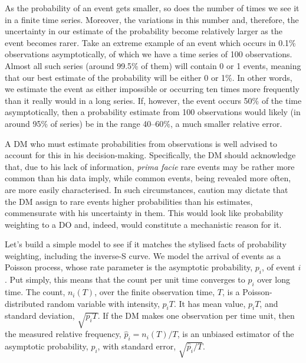 \documentclass[a4paper, 12pt]{article}
\begin{document}
As the probability of an event gets smaller, so does the number of times we see it in a finite time series. Moreover, the variations in this number and, therefore, the uncertainty in our estimate of the probability become relatively larger as the event becomes rarer. Take an extreme example of an event which occurs in 0.1\% observations asymptotically, of which we have a time series of 100 observations. Almost all such series (around 99.5\% of them) will contain 0 or 1 events, meaning that our best estimate of the probability will be either 0 or 1\%. In other words, we estimate the event as either impossible or occurring ten times more frequently than it really would in a long series. If, however, the event occurs 50\% of the time asymptotically, then a probability estimate from 100 observations would likely (in around 95\% of series) be in the range 40--60\%, a much smaller relative error.

A DM who must estimate probabilities from observations is well advised to account for this in his decision-making. Specifically, the DM should acknowledge that, due to his lack of information, {\it prima facie} rare events may be rather more common than his data imply, while common events, being revealed more often, are more easily characterised. In such circumstances, caution may dictate that the DM assign to rare events higher probabilities than his estimates, commensurate with his uncertainty in them. This would look like probability weighting to a DO and, indeed, would constitute a mechanistic reason for it.

Let's build a simple model to see if it matches the stylised facts of probability weighting, including the inverse-S curve. We model the arrival of events as a Poisson process, whose rate parameter is the asymptotic probability, $p_i$, of event $i$. Put simply, this means that the count per unit time converges to $p_i$ over long time. The count, $n_i(T)$, over the finite observation time, $T$, is a Poisson-distributed random variable with intensity, $p_i T$. It has mean value, $p_i T$, and standard deviation, $\sqrt{p_i T}$. If the DM makes one observation per time unit, then the measured relative frequency, $\hat{p}_i = n_i(T)/T$, is an unbiased estimator of the asymptotic probability, $p_i$, with standard error, $\sqrt{\hat{p}_i/T}$.
\end{document}
